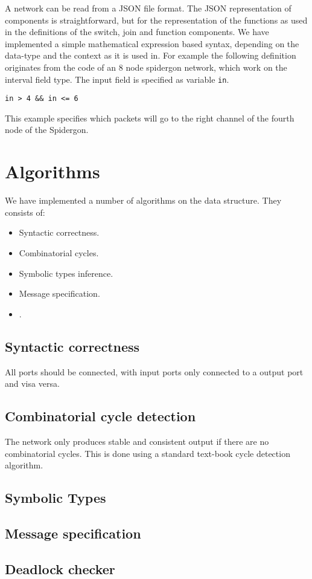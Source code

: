 \documentclass[a4paper]{article}
\begin{document}
A network can be read from a JSON file format. The JSON representation of components is straightforward, but for the representation of the functions as used in the definitions of the \xmas switch, join and function components. We have implemented a simple mathematical expression based syntax, depending on the data-type and the context as it is used in. For example the following definition originates from the code of an 8 node spidergon network, which work on the interval field type. The input field is specified as variable \lstinline|in|.

\begin{lstlisting}[numbers=none]
in > 4 && in <= 6
\end{lstlisting}

This example specifies which packets will go to the right channel of the fourth node of the Spidergon.

\section{Algorithms}

We have implemented a number of algorithms on the data structure. They consists of:
\begin{itemize}
\item Syntactic correctness.
\item Combinatorial cycles.
\item Symbolic types inference.
\item Message specification.
\item {}.
\end{itemize}

\subsection{Syntactic correctness}
All ports should be connected, with input ports only connected to a output port and visa versa.

\subsection{Combinatorial cycle detection}
The network only produces stable and consistent output if there are no combinatorial cycles. This is done using a standard text-book cycle detection algorithm.

\subsection{Symbolic Types}

\subsection{Message specification}

\subsection{Deadlock checker}
\end{document}
